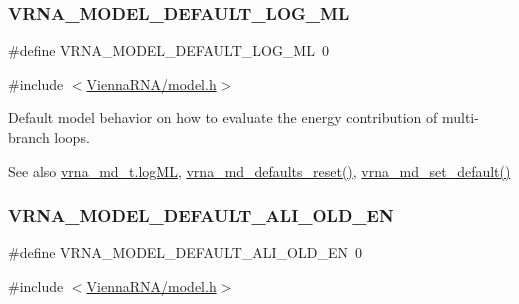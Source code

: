 \subsubsection{\texorpdfstring{V\+R\+N\+A\+\_\+\+M\+O\+D\+E\+L\+\_\+\+D\+E\+F\+A\+U\+L\+T\+\_\+\+L\+O\+G\+\_\+\+ML}{VRNA\_MODEL\_DEFAULT\_LOG\_ML}}
{\footnotesize\ttfamily \#define V\+R\+N\+A\+\_\+\+M\+O\+D\+E\+L\+\_\+\+D\+E\+F\+A\+U\+L\+T\+\_\+\+L\+O\+G\+\_\+\+ML~0}



{\ttfamily \#include $<$\mbox{\hyperlink{model_8h}{Vienna\+R\+N\+A/model.\+h}}$>$}



Default model behavior on how to evaluate the energy contribution of multi-\/branch loops. 

\begin{DoxySeeAlso}{See also}
\mbox{\hyperlink{group__model__details_ae259f89a94acae0c7f1412603e7f57b5}{vrna\+\_\+md\+\_\+t.\+log\+ML}}, \mbox{\hyperlink{group__model__details_ga70834424cf804d149937de89f80ceb45}{vrna\+\_\+md\+\_\+defaults\+\_\+reset()}}, \mbox{\hyperlink{group__model__details_ga8ac6ff84936282436f822644bf841f66}{vrna\+\_\+md\+\_\+set\+\_\+default()}} 
\end{DoxySeeAlso}
\mbox{\label{group__model__details_ga2a5bbfc1edf33077e39466d2d9807115}} 
\subsubsection{\texorpdfstring{V\+R\+N\+A\+\_\+\+M\+O\+D\+E\+L\+\_\+\+D\+E\+F\+A\+U\+L\+T\+\_\+\+A\+L\+I\+\_\+\+O\+L\+D\+\_\+\+EN}{VRNA\_MODEL\_DEFAULT\_ALI\_OLD\_EN}}
{\footnotesize\ttfamily \#define V\+R\+N\+A\+\_\+\+M\+O\+D\+E\+L\+\_\+\+D\+E\+F\+A\+U\+L\+T\+\_\+\+A\+L\+I\+\_\+\+O\+L\+D\+\_\+\+EN~0}



{\ttfamily \#include $<$\mbox{\hyperlink{model_8h}{Vienna\+R\+N\+A/model.\+h}}$>$}




